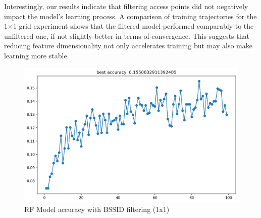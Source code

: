 \documentclass[conference]{IEEEtran}
\begin{document}
	Interestingly, our results indicate that filtering access points did not negatively impact the model's learning process. A comparison of training trajectories for the 1×1 grid experiment shows that the filtered model performed comparably to the unfiltered one, if not slightly better in terms of convergence. This suggests that reducing feature dimensionality not only accelerates training but may also make learning more stable.
	
	\begin{figure}[hbt!]
		\centering
		\begin{minipage}{0.45\textwidth}
			\centering
			\includegraphics[width=\linewidth]{image5.png}
			\caption{RF Model accuracy with BSSID filtering (1x1)} %
			

\end{minipage}
\end{figure}
\end{document}
